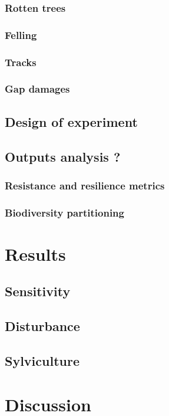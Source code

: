 \documentclass[]{article}
\theoremstyle{definition}
\theoremstyle{definition}
\theoremstyle{remark}
\begin{document}
\subsubsection{Rotten trees}\label{rotten-trees}

\subsubsection{Felling}\label{felling}

\subsubsection{Tracks}\label{tracks}

\subsubsection{Gap damages}\label{gap-damages}

\subsection{Design of experiment}\label{design-of-experiment-1}

\subsection{Outputs analysis ?}\label{outputs-analysis}

\subsubsection{Resistance and resilience
metrics}\label{resistance-and-resilience-metrics-1}

\subsubsection{Biodiversity
partitioning}\label{biodiversity-partitioning-1}

\section{Results}\label{results}

\subsection{Sensitivity}\label{sensitivity}

\subsection{Disturbance}\label{disturbance-1}

\subsection{Sylviculture}\label{sylviculture}

\section{Discussion}\label{discussion}


\end{document}
